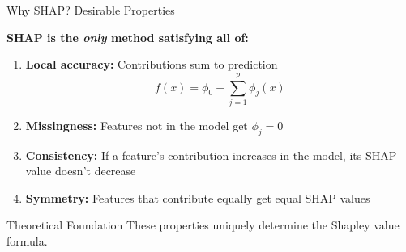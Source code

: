 \documentclass[10pt]{beamer}
\begin{document}

\begin{frame}{Why SHAP? Desirable Properties}

  \textbf{SHAP is the \emph{only} method satisfying all of:}

  \vspace{1em}
  \begin{enumerate}
    \item \textbf{Local accuracy:} Contributions sum to prediction
    \[
    f(x) = \phi_0 + \sum_{j=1}^{p} \phi_j(x)
    \]

    \vspace{0.5em}
    \item \textbf{Missingness:} Features not in the model get $\phi_j = 0$

    \vspace{0.5em}
    \item \textbf{Consistency:} If a feature's contribution increases in the model, its SHAP value doesn't decrease

    \vspace{0.5em}
    \item \textbf{Symmetry:} Features that contribute equally get equal SHAP values
  \end{enumerate}

  \vspace{0.5em}
  \begin{block}{Theoretical Foundation}
    These properties uniquely determine the Shapley value formula.
  \end{block}
\end{frame}

\end{document}
